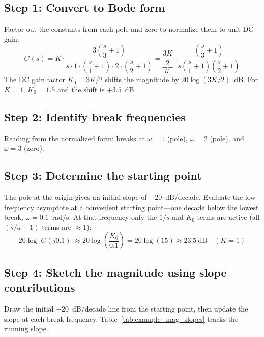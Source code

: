 \documentclass[../../book.tex]{subfiles}
\begin{document}
\subsection*{Step 1: Convert to Bode form}

Factor out the constants from each pole and zero to normalize them to unit
DC gain:
\begin{equation}
  G(s) = K \cdot \frac{3\!\left(\dfrac{s}{3}+1\right)}
                      {s \cdot 1\cdot\left(\dfrac{s}{1}+1\right)
                              \cdot 2\cdot\left(\dfrac{s}{2}+1\right)}
       = \underbrace{\frac{3K}{2}}_{\displaystyle K_0}
         \cdot
         \frac{\left(\dfrac{s}{3}+1\right)}
              {s\!\left(\dfrac{s}{1}+1\right)\!\left(\dfrac{s}{2}+1\right)}
  \label{eq:example_bode_form}
\end{equation}
The DC gain factor $K_0 = 3K/2$ shifts the magnitude by $20\log(3K/2)$~dB.
For $K = 1$, $K_0 = 1.5$ and the shift is $+3.5$~dB.

\subsection*{Step 2: Identify break frequencies}

Reading from the normalized form: breaks at $\omega = 1$ (pole), $\omega = 2$
(pole), and $\omega = 3$ (zero).

\subsection*{Step 3: Determine the starting point}

The pole at the origin gives an initial slope of $-20$~dB/decade.  Evaluate
the low-frequency asymptote at a convenient starting point---one decade below
the lowest break, $\omega = 0.1$~rad/s.  At that frequency only the $1/s$ and
$K_0$ terms are active (all $(s/a+1)$ terms are $\approx 1$):
\begin{equation}
  20\log|G(j0.1)| \approx 20\log\!\left(\frac{K_0}{0.1}\right)
    = 20\log(15) \approx 23.5~\text{dB} \quad (K=1)
  \label{eq:example_start}
\end{equation}

\subsection*{Step 4: Sketch the magnitude using slope contributions}

Draw the initial $-20$~dB/decade line from the starting point, then update
the slope at each break frequency.  Table~\ref{tab:example_mag_slopes} tracks
the running slope.
\end{document}

